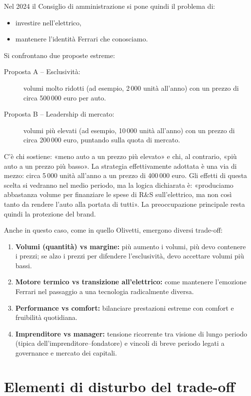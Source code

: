 \documentclass[a4paper,12pt]{article}
\begin{document}
	Nel 2024 il Consiglio di amministrazione si pone quindi il problema di:
	\begin{itemize}
		\item investire nell'elettrico,
		\item mantenere l'identità Ferrari che conosciamo.
	\end{itemize}
	
	Si confrontano due proposte estreme:
	\begin{description}
		\item[Proposta A -- Esclusività:] volumi molto ridotti (ad esempio, 2\,000 unità all'anno) con un prezzo di circa 500\,000 euro per auto.
		\item[Proposta B -- Leadership di mercato:] volumi più elevati (ad esempio, 10\,000 unità all'anno) con un prezzo di circa 200\,000 euro, puntando sulla quota di mercato.
	\end{description}
	
	C'è chi sostiene: «meno auto a un prezzo più elevato» e chi, al contrario, «più auto a un prezzo più basso».%
	La strategia effettivamente adottata è una via di mezzo: circa 5\,000 unità all'anno a un prezzo di 400\,000 euro.%
	Gli effetti di questa scelta si vedranno nel medio periodo, ma la logica dichiarata è: «produciamo abbastanza volume per finanziare le spese di R\&S sull'elettrico, ma non così tanto da rendere l'auto alla portata di tutti».%
	La preoccupazione principale resta quindi la protezione del brand.
	
	Anche in questo caso, come in quello Olivetti, emergono diversi trade-off:
	\begin{enumerate}
		\item \textbf{Volumi (quantità) vs margine:} più aumento i volumi, più devo contenere i prezzi; se alzo i prezzi per difendere l'esclusività, devo accettare volumi più bassi.
		\item \textbf{Motore termico vs transizione all'elettrico:} come mantenere l'emozione Ferrari nel passaggio a una tecnologia radicalmente diversa.
		\item \textbf{Performance vs comfort:} bilanciare prestazioni estreme con comfort e fruibilità quotidiana.
		\item \textbf{Imprenditore vs manager:} tensione ricorrente tra visione di lungo periodo (tipica dell'imprenditore–fondatore) e vincoli di breve periodo legati a governance e mercato dei capitali.
	\end{enumerate}
	
	\section{Elementi di disturbo del trade-off}
	
\end{document}
